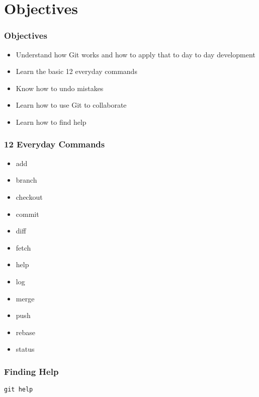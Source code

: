 \section[Section]{Objectives}

\begin{frame}
\frametitle{Objectives}
\begin{itemize}
    \item Understand how Git works and how to apply that to day to day
          development
    \item Learn the basic 12 everyday commands
    \item Know how to undo mistakes
    \item Learn how to use Git to collaborate
    \item Learn how to find help
\end{itemize}
\end{frame}

\begin{frame}
\frametitle{12 Everyday Commands}
\begin{multicols}{3}
    \begin{itemize}
        \setlength\itemsep{3em}
        \item add
        \item branch
        \item checkout
        \item commit
        \item diff
        \item fetch
        \item help
        \item log
        \item merge
        \item push
        \item rebase
        \item status
    \end{itemize}
\end{multicols}
\end{frame}

\begin{frame}
\frametitle{Finding Help}
\alert{\texttt{git help}}
\end{frame}

